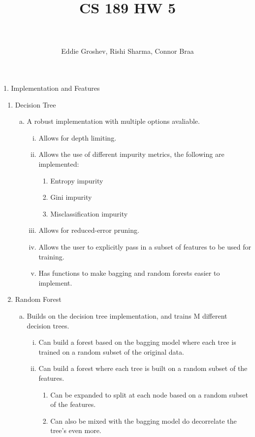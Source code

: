 \documentclass[paper=a4, fontsize=11pt]{scrartcl} %
\title{ 
\normalfont \normalsize 
\horrule{0.5pt} \\[0.4cm] %
\huge CS 189 HW 5 \\ %
\horrule{2pt} \\[-0.1cm] %
}
\author{Eddie Groshev, Rishi Sharma, Connor Braa}
\numberwithin{equation}{section} %
\numberwithin{figure}{section} %
\numberwithin{table}{section} %
\begin{document}
    
\maketitle %


{\Large 1. \indent Implementation and Features}
\\
\begin{enumerate}[(1)]

\item Decision Tree
\begin{enumerate}[(a)]
\item A robust implementation with multiple options avaliable.
\begin{enumerate}[(i)]
\item Allows for depth limiting.
\item Allows the use of different impurity metrics, the following are implemented:
\begin{enumerate}[-]
\item Entropy impurity
\item Gini impurity
\item Misclassification impurity
\end{enumerate}
\item Allows for reduced-error pruning.
\item Allows the user to explicitly pass in a subset of features to be used for training.
\item Has functions to make bagging and random forests easier to implement.
\end{enumerate}
\end{enumerate}


\item Random Forest
\begin{enumerate}[(a)]
\item Builds on the decision tree implementation, and trains M different decision trees.
\begin{enumerate}[(i)]
\item Can build a forest based on the bagging model where each tree is trained on a random subset of the original data.
\item Can build a forest where each tree is built on a random subset of the features.
\begin{enumerate}[-]
\item Can be expanded to split at each node based on a random subset of the features.
\item Can also be mixed with the bagging model do decorrelate the tree's even more.
\end{enumerate}
\end{enumerate}
\end{enumerate}


\end{enumerate}
\end{document}
